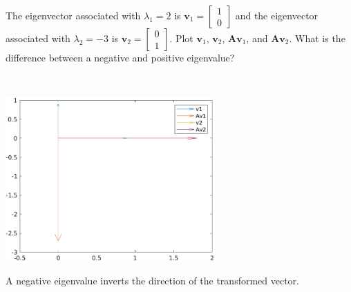 The eigenvector associated with $\lambda_1 = 2$ is $\boldsymbol{v}_1 = \begin{bmatrix}1 \\ 0\end{bmatrix}$ and the eigenvector associated with $\lambda_2 = -3$ is $\boldsymbol{v}_2 = \begin{bmatrix}0 \\ 1\end{bmatrix}$. Plot $\boldsymbol{v}_1$, $\boldsymbol{v}_2$, $\boldsymbol{Av}_1$, and $\boldsymbol{Av}_2$. What is the difference between a negative and positive eigenvalue?

\begin{solution} \
    \begin{center}
        \includegraphics[width=0.6\textwidth]{img/e1p2.png}
    \end{center}

    A negative eigenvalue inverts the direction of the transformed vector.
\end{solution}